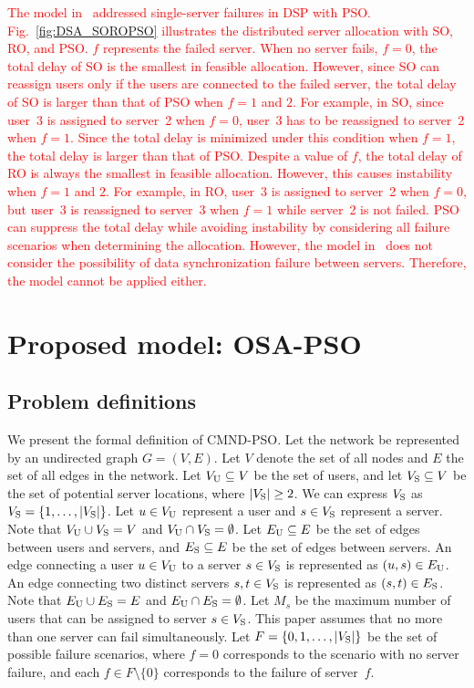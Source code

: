 \documentclass[10pt, letterpaper]{IEEEtran}
\newcommand\red[1]{\textcolor{red}{#1}}
\begin{document}
\begin{CJK}{UTF8}{ipxm}
\red{
The model in~\cite{5_9_Masuda2020} addressed single-server failures in DSP with PSO.
Fig.~\ref{fig:DSA_SOROPSO} illustrates the distributed server allocation with SO, RO, and PSO.
$f$ represents the failed server.
When no server fails, $f = 0$, the total delay of SO is the smallest in feasible allocation.
However, since SO can reassign users only if the users are connected to the failed server, the total delay of SO is larger than that of PSO when $f = 1$ and $2$.
For example, in SO, since user~3 is assigned to server~2 when $f = 0$, user~3 has to be reassigned to server~2 when $f = 1$.
Since the total delay is minimized under this condition when $f = 1$, the total delay is larger than that of PSO.
Despite a value of $f$, the total delay of RO is always the smallest in feasible allocation.
However, this causes instability when $f = 1$ and $2$.
For example, in RO, user~3 is assigned to server~2 when $f = 0$, but user~3 is reassigned to server~3 when $f = 1$ while server~2 is not failed.
PSO can suppress the total delay while avoiding instability by considering all failure scenarios when determining the allocation.
However, the model in~\cite{5_9_Masuda2020} does not consider the possibility of data synchronization failure between servers.
Therefore, the model cannot be applied either.
}

\section{Proposed model: OSA-PSO}
\label{sec:proposed_mode_cmnd_pso}

\subsection{Problem definitions}

We present the formal definition of CMND-PSO. Let the network be represented by an undirected graph $G = (V, E)$.
Let $V$ denote the set of all nodes and $E$ the set of all edges in the network.
Let $V_{\rm{U}} \subseteq V$ be the set of users, and let $V_{\rm{S}} \subseteq V$ be the set of potential server locations, where $|V_{\rm{S}}| \geq 2$.
We can express $V_{\rm{S}}$ as $V_{\rm{S}} = \{1, \ldots, |V_{\rm{S}}|\}$.
Let $u \in V_{\rm{U}}$ represent a user and $s \in V_{\rm{S}}$ represent a server.
Note that $V_{\rm{U}} \cup V_{\rm{S}} = V$ and $V_{\rm{U}} \cap V_{\rm{S}} = \emptyset$.
Let $E_{\rm{U}} \subseteq E$ be the set of edges between users and servers, and $E_{\rm{S}} \subseteq E$ be the set of edges between servers.
An edge connecting a user $u \in V_{\rm{U}}$ to a server $s \in V_{\rm{S}}$ is represented as $(u,s) \in E_{\rm{U}}$.
An edge connecting two distinct servers $s, t \in V_{\rm{S}}$ is represented as $(s, t) \in E_{\rm{S}}$.
Note that $E_{\rm U} \cup E_{\rm S} =E$ and $E_{\rm{U}} \cap E_{\rm{S}} = \emptyset$.
Let $M_s$ be the maximum number of users that can be assigned to server $s \in V_{\rm{S}}$.
This paper assumes that no more than one server can fail simultaneously.
Let $F = \{0, 1, \ldots, |V_{\rm{S}}|\}$ be the set of possible failure scenarios, where $f = 0$ corresponds to the scenario with no server failure, and each $f \in F \setminus \{0\}$ corresponds to the failure of server~$f$.


\end{CJK}
\end{document}
